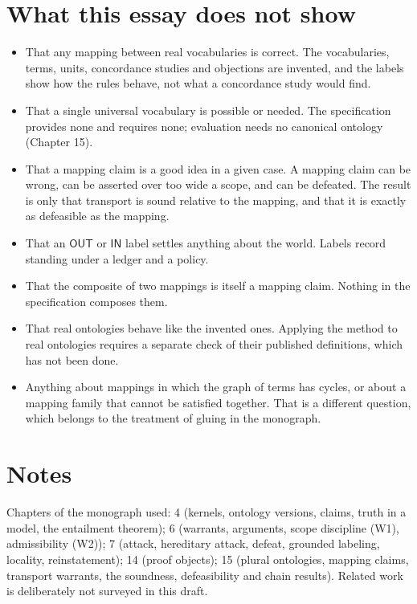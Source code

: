 \documentclass[11pt]{article}
\newcommand{\IN}{\textsf{IN}}
\newcommand{\OUT}{\textsf{OUT}}
\begin{document}
\section{What this essay does not show}\label{sec:notshown}

\begin{itemize}
\item That any mapping between real vocabularies is correct. The vocabularies, terms, units, concordance studies and objections are invented, and the labels show how the rules behave, not what a concordance study would find.
\item That a single universal vocabulary is possible or needed. The specification provides none and requires none; evaluation needs no canonical ontology (Chapter 15).
\item That a mapping claim is a good idea in a given case. A mapping claim can be wrong, can be asserted over too wide a scope, and can be defeated. The result is only that transport is sound relative to the mapping, and that it is exactly as defeasible as the mapping.
\item That an $\OUT$ or $\IN$ label settles anything about the world. Labels record standing under a ledger and a policy.
\item That the composite of two mappings is itself a mapping claim. Nothing in the specification composes them.
\item That real ontologies behave like the invented ones. Applying the method to real ontologies requires a separate check of their published definitions, which has not been done.
\item Anything about mappings in which the graph of terms has cycles, or about a mapping family that cannot be satisfied together. That is a different question, which belongs to the treatment of gluing in the monograph.
\end{itemize}

\section*{Notes}

Chapters of the monograph used: 4 (kernels, ontology versions, claims, truth in a model, the entailment theorem); 6 (warrants, arguments, scope discipline (W1), admissibility (W2)); 7 (attack, hereditary attack, defeat, grounded labeling, locality, reinstatement); 14 (proof objects); 15 (plural ontologies, mapping claims, transport warrants, the soundness, defeasibility and chain results). Related work is deliberately not surveyed in this draft.

\end{document}
